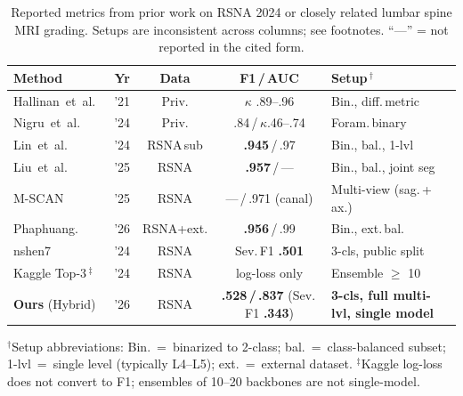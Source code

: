 \documentclass[conference]{IEEEtran}
\newcommand{\best}[1]{\textcolor{best}{\textbf{#1}}}
\begin{document}
\begin{table}[t]
\centering
\caption{Reported metrics from prior work on RSNA 2024 or closely
related lumbar spine MRI grading. Setups are inconsistent across
columns; see footnotes. ``—'' = not reported in the cited form.}
\label{tab:sota}
\renewcommand{\arraystretch}{1.05}
\setlength{\tabcolsep}{4pt}
\footnotesize
\begin{tabular}{@{}lcccl@{}}
\toprule
Method & Yr & Data & F1\,/\,AUC & Setup\,$^\dagger$ \\
\midrule
Hallinan~et~al.~\cite{hallinan2021}      & '21 & Priv.   & $\kappa$ .89--.96 & Bin., diff.\,metric \\
Nigru~et~al.~\cite{nigru2024}            & '24 & Priv.   & .84\,/\,$\kappa$.46--.74 & Foram.\,binary \\
Lin~et~al.~\cite{lin2024cbam}            & '24 & RSNA\,sub & \best{.945}\,/\,.97 & Bin., bal., 1-lvl \\
Liu~et~al.~\cite{aktan2025}              & '25 & RSNA    & \best{.957}\,/\,—   & Bin., bal., joint seg \\
M-SCAN~\cite{hong2025mscan}              & '25 & RSNA    & —\,/\,.971 (canal) & Multi-view (sag.\,+\,ax.) \\
Phaphuang.~\cite{phaphuangwittayakul2026}& '26 & RSNA+ext. & \best{.956}\,/\,.99 & Bin., ext.\,bal. \\
nshen7~\cite{nshen2024}                  & '24 & RSNA & Sev.\,F1 \best{.501} & 3-cls, public split \\
Kaggle Top-3\,$^\ddagger$ \cite{kaggle2024} & '24 & RSNA & log-loss only & Ensemble $\geq$ 10 \\
\midrule
\textbf{Ours} (Hybrid)                   & '26 & RSNA    & \textbf{.528\,/\,.837} (Sev.\,F1 \textbf{.343}) & \textbf{3-cls, full multi-lvl, single model} \\
\bottomrule
\end{tabular}

\vspace{2pt}
\par
{\raggedright\scriptsize
$^\dagger$Setup abbreviations: Bin.~=~binarized to 2-class;
bal.~=~class-balanced subset; 1-lvl~=~single level (typically L4--L5);
ext.~=~external dataset. $^\ddagger$Kaggle log-loss does not convert
to F1; ensembles of 10--20 backbones are not single-model.\par}
\end{table}


\end{document}
